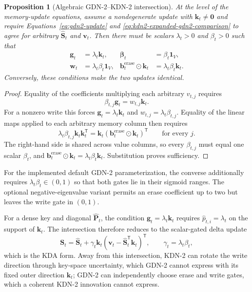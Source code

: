 \documentclass[11pt]{article}
\newcommand{\ve}[1]{\boldsymbol{#1}}
\newcommand{\tr}{\mathsf{T}}
\newtheorem{proposition}{Proposition}
\begin{document}
\begin{proposition}[Algebraic GDN-2--KDN-2 intersection]
At the level of the memory-update equations, assume a nondegenerate update with
$\ve{k}_t\ne\ve{0}$ and require
Equations~\eqref{eq:gdn2-update} and \eqref{eq:kdn2-expanded-gdn2-comparison} to agree for arbitrary
$\widehat{\ve{S}}_t$ and $\ve{v}_t$.  Then there must be scalars $\lambda_t>0$ and
$\beta_t>0$ such that
\begin{equation}
\begin{aligned}
  \ve{g}_t&=\lambda_t\ve{k}_t,
  &
  \ve{\beta}_t&=\beta_t\ve{1}_V,
  \\
  \ve{w}_t&=\lambda_t\beta_t\ve{1}_V,
  &
  \ve{b}_t^{\mathrm{erase}}\odot\ve{k}_t
  &=\lambda_t\beta_t\ve{k}_t.
\end{aligned}
  \label{eq:gdn2-kdn2-intersection}
\end{equation}
Conversely, these conditions make the two updates identical.
\end{proposition}

\begin{proof}
Equality of the coefficients multiplying each arbitrary $v_{t,j}$ requires
\begin{equation}
  \beta_{t,j}\ve{g}_t=w_{t,j}\ve{k}_t.
  \label{eq:gdn2-kdn2-write-condition}
\end{equation}
For a nonzero write this forces $\ve{g}_t=\lambda_t\ve{k}_t$ and
$w_{t,j}=\lambda_t\beta_{t,j}$.  Equality of the linear maps applied to each arbitrary memory
column then requires
\begin{equation}
  \lambda_t\beta_{t,j}\ve{k}_t\ve{k}_t^{\tr}
  =\ve{k}_t(\ve{b}_t^{\mathrm{erase}}\odot\ve{k}_t)^{\tr}
  \qquad\text{for every }j.
  \label{eq:gdn2-kdn2-erase-condition}
\end{equation}
The right-hand side is shared across value columns, so every $\beta_{t,j}$ must equal one scalar
$\beta_t$, and
$\ve{b}_t^{\mathrm{erase}}\odot\ve{k}_t
=\lambda_t\beta_t\ve{k}_t$.  Substitution proves sufficiency.
\end{proof}

For the implemented default GDN-2 parameterization, the converse additionally requires
$\lambda_t\beta_t\in(0,1)$ so that both gates lie in their sigmoid ranges.  The optional
negative-eigenvalue variant permits an erase coefficient up to two but leaves the write gate in
$(0,1)$.

For a dense key and diagonal $\widehat{\ve{P}}_t$, the condition
$\ve{g}_t=\lambda_t\ve{k}_t$ requires
$\widehat p_{t,i}=\lambda_t$ on the support of $\ve{k}_t$.  The intersection therefore reduces to
the scalar-gated delta update
\begin{equation}
  \ve{S}_t
  =\widehat{\ve{S}}_t
   +\gamma_t\ve{k}_t
    (\ve{v}_t-\widehat{\ve{S}}_t^{\tr}\ve{k}_t)^{\tr},
  \qquad
  \gamma_t=\lambda_t\beta_t,
  \label{eq:gdn2-kdn2-scalar-intersection}
\end{equation}
which is the KDA form.  Away from this intersection, KDN-2 can rotate the write direction through
key-space uncertainty, which GDN-2 cannot express with its fixed outer direction $\ve{k}_t$;
GDN-2 can independently choose erase and write gates, which a coherent KDN-2 innovation cannot
express.
\end{document}
